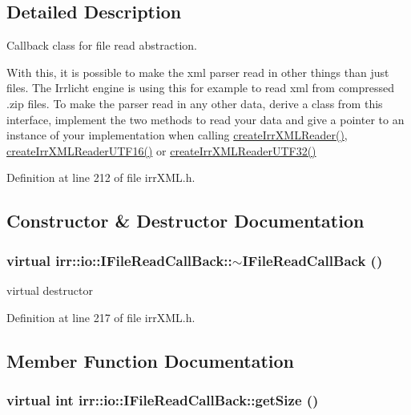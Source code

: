 \subsection{Detailed Description}
Callback class for file read abstraction. 

With this, it is possible to make the xml parser read in other things than just files. The Irrlicht engine is using this for example to read xml from compressed .zip files. To make the parser read in any other data, derive a class from this interface, implement the two methods to read your data and give a pointer to an instance of your implementation when calling \hyperlink{namespaceirr_1_1io_a79dd5b9dae1b75be3dec4374176a5ce}{createIrrXMLReader()}, \hyperlink{namespaceirr_1_1io_41c9d4c0d94702b3da2dca5799384443}{createIrrXMLReaderUTF16()} or \hyperlink{namespaceirr_1_1io_42c53128ecf88af927030b6b9ea5afc2}{createIrrXMLReaderUTF32()} 

Definition at line 212 of file irrXML.h.

\subsection{Constructor \& Destructor Documentation}
\hypertarget{classirr_1_1io_1_1_i_file_read_call_back_91ace84f0a3966d88d78da5342eb9619}{
\subsubsection[{$\sim$IFileReadCallBack}]{\setlength{\rightskip}{0pt plus 5cm}virtual irr::io::IFileReadCallBack::$\sim$IFileReadCallBack ()}}
\label{classirr_1_1io_1_1_i_file_read_call_back_91ace84f0a3966d88d78da5342eb9619}


virtual destructor 



Definition at line 217 of file irrXML.h.

\subsection{Member Function Documentation}
\hypertarget{classirr_1_1io_1_1_i_file_read_call_back_51e3ae6f16cf3058800cb905f3b21b23}{
\subsubsection[{getSize}]{\setlength{\rightskip}{0pt plus 5cm}virtual int irr::io::IFileReadCallBack::getSize ()}}
\label{classirr_1_1io_1_1_i_file_read_call_back_51e3ae6f16cf3058800cb905f3b21b23}


